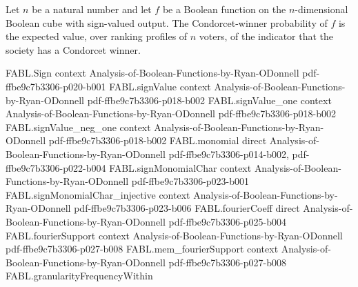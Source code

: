 \begin{definition}
\label{FABL.condorcetWinnerProbability}
\leanok
{}
Let $n$ be a natural number and let $f$ be a Boolean function on the $n$-dimensional
Boolean cube with sign-valued output. The Condorcet-winner probability of $f$ is the
expected value, over ranking profiles of $n$ voters, of the indicator that the society
has a Condorcet winner.
\end{definition}

\begin{theorem}
\label{FABL.condorcetWinnerIndicator_eq_nae3}
\leanok
{}
\proofstep
  {FABL.Sign}
  {context}
  {Analysis-of-Boolean-Functions-by-Ryan-ODonnell}
  {pdf-ffbe9c7b3306-p020-b001}
\proofstep
  {FABL.signValue}
  {context}
  {Analysis-of-Boolean-Functions-by-Ryan-ODonnell}
  {pdf-ffbe9c7b3306-p018-b002}
\proofstep
  {FABL.signValue_one}
  {context}
  {Analysis-of-Boolean-Functions-by-Ryan-ODonnell}
  {pdf-ffbe9c7b3306-p018-b002}
\proofstep
  {FABL.signValue_neg_one}
  {context}
  {Analysis-of-Boolean-Functions-by-Ryan-ODonnell}
  {pdf-ffbe9c7b3306-p018-b002}
\proofstep
  {FABL.monomial}
  {direct}
  {Analysis-of-Boolean-Functions-by-Ryan-ODonnell}
  {pdf-ffbe9c7b3306-p014-b002,
    pdf-ffbe9c7b3306-p022-b004}
\proofstep
  {FABL.signMonomialChar}
  {context}
  {Analysis-of-Boolean-Functions-by-Ryan-ODonnell}
  {pdf-ffbe9c7b3306-p023-b001}
\proofstep
  {FABL.signMonomialChar_injective}
  {context}
  {Analysis-of-Boolean-Functions-by-Ryan-ODonnell}
  {pdf-ffbe9c7b3306-p023-b006}
\proofstep
  {FABL.fourierCoeff}
  {direct}
  {Analysis-of-Boolean-Functions-by-Ryan-ODonnell}
  {pdf-ffbe9c7b3306-p025-b004}
\proofstep
  {FABL.fourierSupport}
  {context}
  {Analysis-of-Boolean-Functions-by-Ryan-ODonnell}
  {pdf-ffbe9c7b3306-p027-b008}
\proofstep
  {FABL.mem_fourierSupport}
  {context}
  {Analysis-of-Boolean-Functions-by-Ryan-ODonnell}
  {pdf-ffbe9c7b3306-p027-b008}
\proofstep
  {FABL.granularityFrequencyWithin}

\end{theorem}
